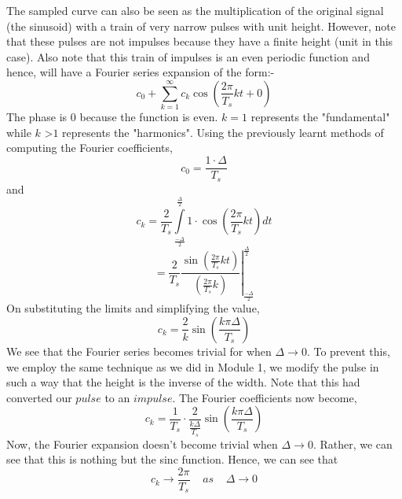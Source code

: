 \noindent The sampled curve can also be seen as the multiplication of the original signal (the sinusoid) with a train of very narrow pulses with unit height. However, note that these pulses are not impulses because they have a finite height (unit in this case).
\newline
Also note that this train of impulses is an even periodic function and hence, will have a Fourier series expansion of the form:-
\[
c_{0}+ \sum_{k=1}^{\infty} c_{k} \cos (\frac{2\pi}{T_{s}}kt + 0)
\]
The phase is $0$ because the function is even. $k=1$ represents the "fundamental" while $k$ \textgreater $1$ represents the "harmonics".
\newline
Using the previously learnt methods of computing the Fourier coefficients, 
\[
c_{0}=\frac{1\cdot \Delta}{T_{s}}
\]
and
\[
c_{k}=\frac{2}{T_{s}} \int \limits_{\frac{-\Delta}{2}}^{\frac{\Delta}{2}} 1 \cdot \cos (\frac{2\pi}{T_{s}}kt) dt
\]
\[
=\left.\frac{2}{T_{s}} \frac{\sin (\frac{2\pi}{T_{s}}kt)}{(\frac{2\pi}{T_{s}}k)} \right|_{\frac{-\Delta}{2}}^{\frac{\Delta}{2}}
\]
On substituting the limits and simplifying the value,
\[
c_{k}=\frac{2}{k} \sin (\frac{k\pi \Delta}{T_{s}})
\]
We see that the Fourier series becomes trivial for when $\Delta \rightarrow 0 $. To prevent this, we employ the same technique as we did in Module 1, we modify the pulse in such a way that the height is the inverse of the width. Note that this had converted our $pulse$ to an $impulse$.
\newline
The Fourier coefficients now become,
\[
c_{k}=\frac{1}{T_{s}}\cdot\frac{2}{\frac{k\Delta}{T_{s}}} \sin (\frac{k\pi \Delta}{T_{s}})
\]
Now, the Fourier expansion doesn't become trivial when $\Delta \rightarrow 0$. Rather, we can see that this is nothing but the sinc function.
\newline
Hence, we can see that 
\[
c_{k} \rightarrow \frac{2\pi}{T_{s}} \;\;\;\; as \;\;\;\; \Delta \rightarrow 0
\]

